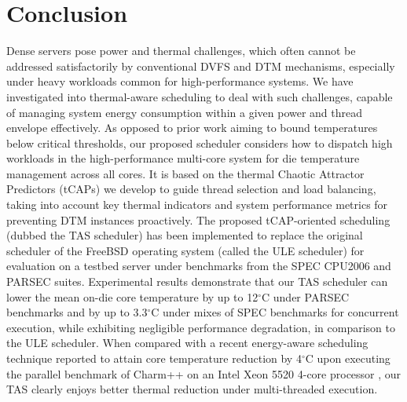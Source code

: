 \documentclass[times, 10pt,twocolumn]{IEEEtran}
\begin{document}
\newline
\section{Conclusion}
\label{sec:conclusion}
Dense servers pose power and thermal challenges, which often cannot be addressed
satisfactorily by conventional DVFS and DTM mechanisms, especially under heavy workloads common for high-performance systems.
We have investigated into thermal-aware scheduling to deal with such challenges, capable of managing system energy consumption within a given
power and thread envelope effectively.   
As opposed to prior work aiming to bound temperatures below critical thresholds,
our proposed scheduler considers how to dispatch high workloads in the 
high-performance multi-core system for die temperature management across all cores.  
It is based on the thermal Chaotic Attractor Predictors (tCAPs) we develop
to guide thread selection and load balancing, taking into account key thermal
indicators and system performance metrics for preventing DTM instances proactively.
The proposed tCAP-oriented scheduling (dubbed the TAS scheduler) has been implemented to replace the original scheduler of the FreeBSD operating system (called the ULE scheduler) for evaluation on a testbed server under benchmarks from the SPEC CPU2006 and PARSEC suites.
Experimental results demonstrate that our TAS scheduler can lower the mean on-die core temperature by up to 12$^{\circ}$C under PARSEC benchmarks and by up to 3.3$^{\circ}$C under mixes of SPEC benchmarks for concurrent execution, while exhibiting negligible performance degradation, in comparison to the ULE scheduler.
When compared with a recent energy-aware scheduling technique reported to 
attain core temperature reduction by 4$^\circ$C upon executing
the parallel benchmark of Charm++ on an Intel Xeon 5520 4-core processor \cite{Sarood2011},
our TAS clearly enjoys better thermal reduction under multi-threaded execution.

\newline
\label{sec:references}
\begin{small}


\end{small}
\end{document}
